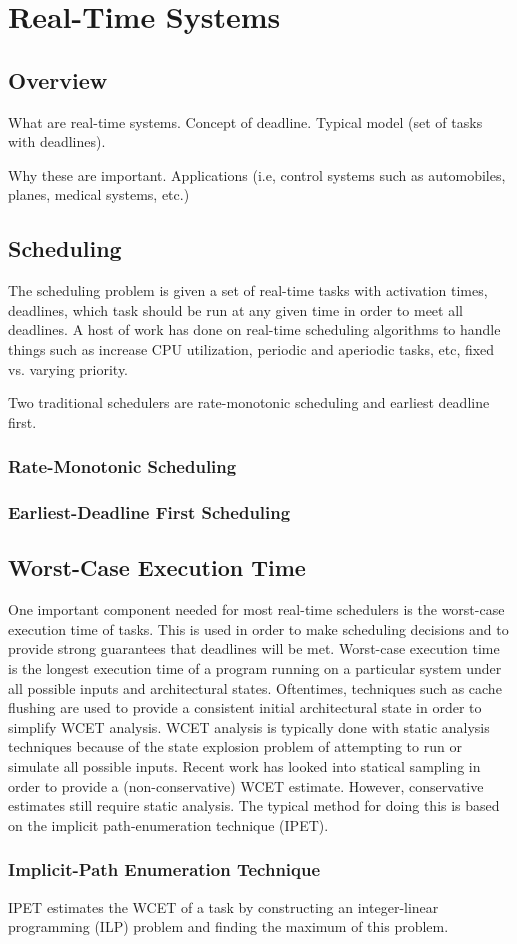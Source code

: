 \chapter{Real-Time Systems}
\label{chap:realtime_systems}

\section{Overview}

What are real-time systems. Concept of deadline. Typical model (set of tasks
with deadlines).

Why these are important.  Applications (i.e, control systems such as
automobiles, planes, medical systems, etc.)

\section{Scheduling}

The scheduling problem is given a set of real-time tasks with activation times,
deadlines, which task should be run at any given time in order to meet all
deadlines. A host of work has done on real-time scheduling algorithms to handle
things such as increase CPU utilization, periodic and aperiodic tasks, etc,
fixed vs. varying priority.

Two traditional schedulers are rate-monotonic scheduling and earliest deadline first.

\subsection{Rate-Monotonic Scheduling}

\subsection{Earliest-Deadline First Scheduling}

\section{Worst-Case Execution Time}

One important component needed for most real-time schedulers is the worst-case
execution time of tasks. This is used in order to make scheduling decisions and
to provide strong guarantees that deadlines will be met. Worst-case execution
time is the longest execution time of a program running on a particular system
under all possible inputs and architectural states. Oftentimes, techniques such
as cache flushing are used to provide a consistent initial architectural state
in order to simplify WCET analysis. WCET analysis is typically done with static
analysis techniques because of the state explosion problem of attempting to run
or simulate all possible inputs. Recent work has looked into statical sampling
in order to provide a (non-conservative) WCET estimate. However, conservative
estimates still require static analysis. The typical method for doing this is
based on the implicit path-enumeration technique (IPET).

\subsection{Implicit-Path Enumeration Technique}

IPET estimates the WCET of a task by constructing an integer-linear programming
(ILP) problem and finding the maximum of this problem.
